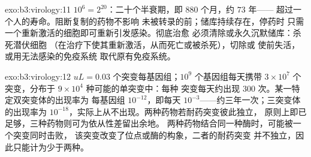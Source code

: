 \begin{solution}{exo:b3:virology:11}
$10^{6} = 2^{20}$：二十个半衰期，即 $880$ 个月，约 $73$ 年——
超过一个人的寿命。阻断复制的药物不影响
未被转录的前；储库持续存在，停药时
只需一个重新激活的细胞即可重新引发感染。彻底治愈
必须清除或永久沉默储库：杀死潜伏细胞
（在治疗下使其重新激活，从而死亡或被杀死），切除或
使前失活，或用无法感染的免疫系统
取代原有免疫系统。
\end{solution}

\begin{solution}{exo:b3:virology:12}
$uL = 0.03$ 个突变每基因组；$10^{9}$ 个基因组每天携带 $3\times
10^{7}$ 个突变，分布于 $9\times 10^{4}$ 种可能的单突变中：每种
突变每天约出现 $300$ 次。某一特定双突变体的出现率为
每基因组 $10^{-12}$，即每天 $10^{-3}$——约三年一次；三突变体
的出现率为 $10^{-18}$，实际上从不出现。两种药物若耐药突变彼此独立，
原则上即已足够，三种药物则可为依从性差留出余地。
两种药物结合同一种酶时，可能被一个突变同时击败，
该突变改变了位点或酶的构象，二者的耐药突变
并不独立，因此只能计为少于两种。
\end{solution}


